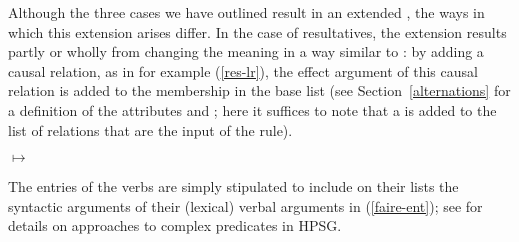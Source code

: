 \documentclass[output=paper,biblatex,babelshorthands,newtxmath,draftmode,colorlinks, citecolor=brown]{langscibook}
\begin{document}
Although the three cases we have outlined result in an extended \argst, the ways in which this extension arises differ. In the case of resultatives, the extension results partly or wholly from changing the meaning in a way similar to \citet{RappaportandLevin1998}: by adding a causal relation, as in for example (\ref{res-lr}), the effect argument of this causal relation is added to the membership in the base \argst list (see Section~\ref{alternations} for a definition of the attributes  and ; here it suffices to note that a  is added to the list of relations that are the input of the rule). 

\begin{exe}
\ex\label{res-lr}

	$\mapsto$
\end{exe}


The entries of the  verbs are simply stipulated to include on their \argst lists the syntactic arguments of their (lexical) verbal arguments in (\ref{faire-ent}); see  for details on approaches to complex predicates in HPSG.

\begin{exe}
\ex\label{faire-ent}
\end{exe} 

\noindent
\end{document}
